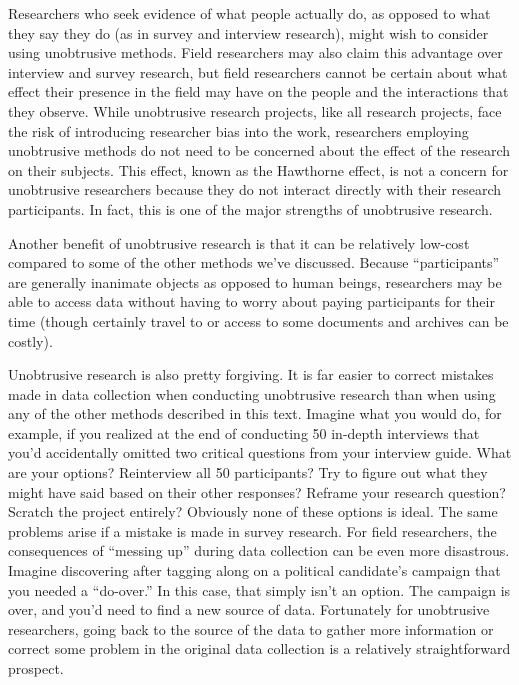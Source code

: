 Researchers who seek evidence of what people actually do, as opposed to what they say they do (as in survey and interview research), might wish to consider using unobtrusive methods. Field researchers may also claim this advantage over interview and survey research, but field researchers cannot be certain about what effect their presence in the field may have on the people and the interactions that they observe. While unobtrusive research projects, like all research projects, face the risk of introducing researcher bias into the work, researchers employing unobtrusive methods do not need to be concerned about the effect of the research on their subjects. This effect, known as the Hawthorne effect, is not a concern for unobtrusive researchers because they do not interact directly with their research participants. In fact, this is one of the major strengths of unobtrusive research.

Another benefit of unobtrusive research is that it can be relatively low-cost compared to some of the other methods we’ve discussed. Because “participants” are generally inanimate objects as opposed to human beings, researchers may be able to access data without having to worry about paying participants for their time (though certainly travel to or access to some documents and archives can be costly).

Unobtrusive research is also pretty forgiving. It is far easier to correct mistakes made in data collection when conducting unobtrusive research than when using any of the other methods described in this text. Imagine what you would do, for example, if you realized at the end of conducting 50 in-depth interviews that you’d accidentally omitted two critical questions from your interview guide. What are your options? Reinterview all 50 participants? Try to figure out what they might have said based on their other responses? Reframe your research question? Scratch the project entirely? Obviously none of these options is ideal. The same problems arise if a mistake is made in survey research. For field researchers, the consequences of “messing up” during data collection can be even more disastrous. Imagine discovering after tagging along on a political candidate’s campaign that you needed a “do-over.” In this case, that simply isn’t an option. The campaign is over, and you’d need to find a new source of data. Fortunately for unobtrusive researchers, going back to the source of the data to gather more information or correct some problem in the original data collection is a relatively straightforward prospect.

